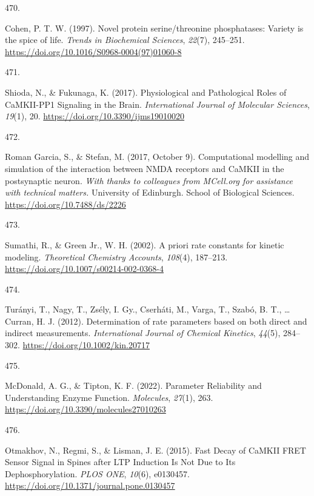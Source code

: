 \documentclass[
  11pt,
  letterpaper,
]{scrreprt}
\newlength{\cslhangindent}
\newlength{\csllabelwidth}
\newenvironment{CSLReferences}[2] %
 {\begin{list}{}{%
  \setlength{\itemindent}{0pt}
  \setlength{\leftmargin}{0pt}
  \setlength{\parsep}{0pt}
  \ifodd #1
   \setlength{\leftmargin}{\cslhangindent}
   \setlength{\itemindent}{-1\cslhangindent}
  \fi
  \setlength{\itemsep}{#2\baselineskip}}}
 {\end{list}}
\newcommand{\CSLLeftMargin}[1]{\parbox[t]{\csllabelwidth}{\strut#1\strut}}
\newcommand{\CSLRightInline}[1]{\parbox[t]{\linewidth - \csllabelwidth}{\strut#1\strut}}
\begin{document}
\begin{CSLReferences}{0}{0}
\CSLLeftMargin{470. }%
\CSLRightInline{Cohen, P. T. W. (1997). Novel protein serine/threonine
phosphatases: {Variety} is the spice of life. \emph{Trends in
Biochemical Sciences}, \emph{22}(7), 245--251.
\url{https://doi.org/10.1016/S0968-0004(97)01060-8}}

\CSLLeftMargin{471. }%
\CSLRightInline{Shioda, N., \& Fukunaga, K. (2017). Physiological and
{Pathological Roles} of {CaMKII-PP1 Signaling} in the {Brain}.
\emph{International Journal of Molecular Sciences}, \emph{19}(1), 20.
\url{https://doi.org/10.3390/ijms19010020}}

\CSLLeftMargin{472. }%
\CSLRightInline{Roman Garcia, S., \& Stefan, M. (2017, October 9).
Computational modelling and simulation of the interaction between {NMDA}
receptors and {CaMKII} in the postsynaptic neuron. \emph{With thanks to
colleagues from MCell.org for assistance with technical matters.}
University of Edinburgh. School of Biological Sciences.
\url{https://doi.org/10.7488/ds/2226}}

\CSLLeftMargin{473. }%
\CSLRightInline{Sumathi, R., \& Green Jr., W. H. (2002). A priori rate
constants for kinetic modeling. \emph{Theoretical Chemistry Accounts},
\emph{108}(4), 187--213.
\url{https://doi.org/10.1007/s00214-002-0368-4}}

\CSLLeftMargin{474. }%
\CSLRightInline{Turányi, T., Nagy, T., Zsély, I. Gy., Cserháti, M.,
Varga, T., Szabó, B. T., \ldots{} Curran, H. J. (2012). Determination of
rate parameters based on both direct and indirect measurements.
\emph{International Journal of Chemical Kinetics}, \emph{44}(5),
284--302. \url{https://doi.org/10.1002/kin.20717}}

\CSLLeftMargin{475. }%
\CSLRightInline{McDonald, A. G., \& Tipton, K. F. (2022). Parameter
{Reliability} and {Understanding Enzyme Function}. \emph{Molecules},
\emph{27}(1), 263. \url{https://doi.org/10.3390/molecules27010263}}

\CSLLeftMargin{476. }%
\CSLRightInline{Otmakhov, N., Regmi, S., \& Lisman, J. E. (2015). Fast
{Decay} of {CaMKII FRET Sensor Signal} in {Spines} after {LTP Induction
Is Not Due} to {Its Dephosphorylation}. \emph{PLOS ONE}, \emph{10}(6),
e0130457. \url{https://doi.org/10.1371/journal.pone.0130457}}


\end{CSLReferences}
\end{document}

